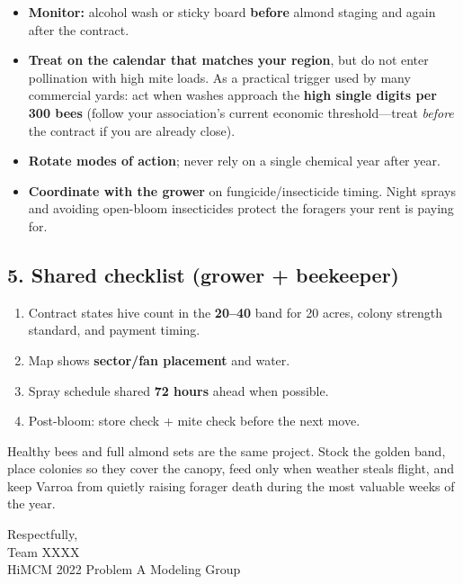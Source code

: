 \documentclass[11pt]{article}
\begin{document}
\begin{itemize}[leftmargin=1.2em]
  \item \textbf{Monitor:} alcohol wash or sticky board \textbf{before}
        almond staging and again after the contract.
  \item \textbf{Treat on the calendar that matches your region}, but do
        not enter pollination with high mite loads. As a practical
        trigger used by many commercial yards: act when washes approach
        the \textbf{high single digits per 300 bees} (follow your
        association's current economic threshold---treat \emph{before}
        the contract if you are already close).
  \item \textbf{Rotate modes of action}; never rely on a single chemical
        year after year.
  \item \textbf{Coordinate with the grower} on fungicide/insecticide
        timing. Night sprays and avoiding open-bloom insecticides
        protect the foragers your rent is paying for.
\end{itemize}

\subsection*{5. Shared checklist (grower + beekeeper)}
\begin{enumerate}[leftmargin=1.2em]
  \item Contract states hive count in the \textbf{20--40} band for 20
        acres, colony strength standard, and payment timing.
  \item Map shows \textbf{sector/fan placement} and water.
  \item Spray schedule shared \textbf{72 hours} ahead when possible.
  \item Post-bloom: store check + mite check before the next move.
\end{enumerate}

\vspace{0.4em}
\noindent
Healthy bees and full almond sets are the same project. Stock the golden
band, place colonies so they cover the canopy, feed only when weather
steals flight, and keep Varroa from quietly raising forager death during
the most valuable weeks of the year.

\vspace{0.8em}
\noindent
Respectfully,\\[0.6em]
Team XXXX\\
HiMCM 2022 Problem A Modeling Group
\end{document}
